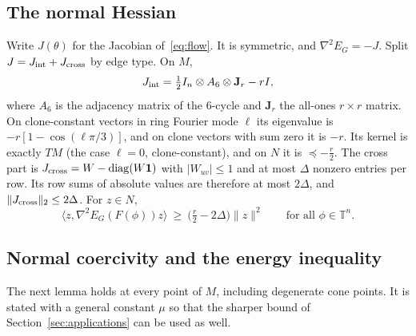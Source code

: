 \documentclass[11pt,a4paper]{article}
\theoremstyle{definition}\newtheorem{conjecture}{Conjecture}
\theoremstyle{remark}\newtheorem{remark}[theorem]{Remark}
\newcommand{\T}{\mathbb T}
\begin{document}
\subsection{The normal Hessian}
Write $J(\theta)$ for the Jacobian of~\eqref{eq:flow}. It is symmetric, and $\nabla^2E_G=-J$. Split $J=J_{\rm int}+J_{\rm cross}$ by edge type. On $M$,
\[
 J_{\rm int}=\tfrac12 I_n\otimes A_6\otimes\mathbf J_r-rI,
\]
where $A_6$ is the adjacency matrix of the $6$-cycle and $\mathbf J_r$ the all-ones $r\times r$ matrix. On clone-constant vectors in ring Fourier mode $\ell$ its eigenvalue is $-r[1-\cos(\ell\pi/3)]$, and on clone vectors with sum zero it is $-r$. Its kernel is exactly $TM$ (the case $\ell=0$, clone-constant), and on $N$ it is $\preceq-\tfrac r2$. The cross part is $J_{\rm cross}=W-\operatorname{diag}(W\mathbf 1)$ with $|W_{uv}|\le1$ and at most $\Delta$ nonzero entries per row. Its row sums of absolute values are therefore at most $2\Delta$, and $\|J_{\rm cross}\|_2\le2\Delta$. For $z\in N$,
\begin{equation}\label{eq:normalbound}
 \langle z,\nabla^2E_G(F(\phi))z\rangle\ \ge\ \bigl(\tfrac r2-2\Delta\bigr)\|z\|^2\qquad\text{for all }\phi\in\T^n .
\end{equation}

\subsection{Normal coercivity and the energy inequality}
The next lemma holds at every point of $M$, including degenerate cone points. It is stated with a general constant $\mu$ so that the sharper bound of Section~\ref{sec:applications} can be used as well.
\end{document}
